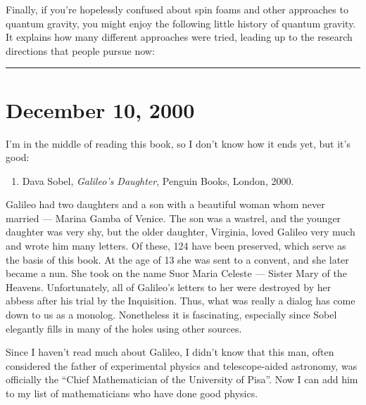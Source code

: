 \documentclass{article}
\def\tightlist{}
\renewcommand{\texttt}[1]{%
  \begingroup
  \ttfamily
  \begingroup\lccode`~=`/\lowercase{\endgroup\def~}{/\discretionary{}{}{}}%
  \begingroup\lccode`~=`[\lowercase{\endgroup\def~}{[\discretionary{}{}{}}%
  \begingroup\lccode`~=`.\lowercase{\endgroup\def~}{.\discretionary{}{}{}}%
  \catcode`/=\active\catcode`[=\active\catcode`.=\active
  \scantokens{#1\noexpand}%
  \endgroup
}
\begin{document}
Finally, if you're hopelessly confused about spin foams and other
approaches to quantum gravity, you might enjoy the following little
history of quantum gravity. It explains how many different approaches
were tried, leading up to the research directions that people pursue
now:


\begin{center}\rule{0.5\linewidth}{0.5pt}\end{center}



\hypertarget{week161}{%
\section{December 10, 2000}\label{week161}}

I'm in the middle of reading this book, so I don't know how it ends yet,
but it's good:

\begin{enumerate}
\def\labelenumi{\arabic{enumi})}
\tightlist
\item
  Dava Sobel, \emph{Galileo's Daughter}, Penguin Books, London, 2000.
\end{enumerate}

Galileo had two daughters and a son with a beautiful woman whom never
married --- Marina Gamba of Venice. The son was a wastrel, and the
younger daughter was very shy, but the older daughter, Virginia, loved
Galileo very much and wrote him many letters. Of these, 124 have been
preserved, which serve as the basis of this book. At the age of 13 she
was sent to a convent, and she later became a nun. She took on the name
Suor Maria Celeste --- Sister Mary of the Heavens. Unfortunately, all of
Galileo's letters to her were destroyed by her abbess after his trial by
the Inquisition. Thus, what was really a dialog has come down to us as a
monolog. Nonetheless it is fascinating, especially since Sobel elegantly
fills in many of the holes using other sources.

Since I haven't read much about Galileo, I didn't know that this man,
often considered the father of experimental physics and telescope-aided
astronomy, was officially the ``Chief Mathematician of the University of
Pisa''. Now I can add him to my list of mathematicians who have done
good physics.
\end{document}
